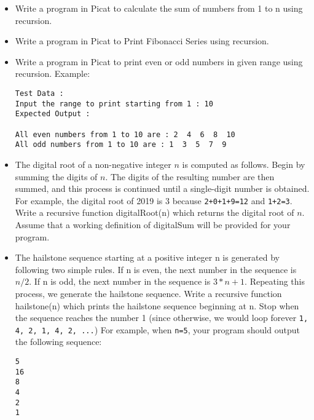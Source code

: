\documentclass[12pt,a4paper]{article}
\begin{document}
\begin{enumerate}
\begin{itemize}
\item Write a program in Picat to calculate the sum of numbers from 1 to n using recursion.

\item  Write a program in Picat to Print Fibonacci Series using recursion. 
\item Write a program in Picat to print even or odd numbers in given range using recursion. Example:
\begin{verbatim}
Test Data : 
Input the range to print starting from 1 : 10 
Expected Output :

All even numbers from 1 to 10 are : 2  4  6  8  10                              
All odd numbers from 1 to 10 are : 1  3  5  7  9   

\end{verbatim}

\item The digital root of a non-negative integer $n$ is computed as follows. Begin by summing the digits of $n$. The digits of the resulting number are then summed, and this process is continued until a single-digit number is obtained. For example, the digital root of 2019 is 3 because \texttt{2+0+1+9=12} and \texttt{1+2=3}. Write a recursive function digitalRoot(n) which returns the digital root of $n$.\\
Assume that a working definition of digitalSum will be provided for your program.



\item The hailstone sequence starting at a positive integer n is generated by following two simple rules. If n is even, the next number in the sequence is $n/2$. If n is odd, the next number in the sequence is $3*n+1$. Repeating this process, we generate the hailstone sequence. Write a recursive function hailstone(n) which prints the hailstone sequence beginning at n. Stop when the sequence reaches the number 1 (since otherwise, we would loop forever \texttt{1, 4, 2, 1, 4, 2, ...}) 
For example, when \texttt{n=5}, your program should output the following sequence:
\begin{verbatim}
5
16
8
4
2
1

\end{verbatim}


\end{itemize}

\end{enumerate}
\end{document}
